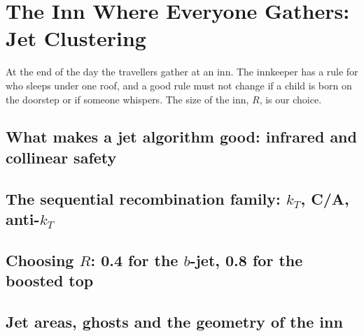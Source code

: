 \chapter{The Inn Where Everyone Gathers: Jet Clustering}
\label{ch:the_inn}

\begin{journeybox}
At the end of the day the travellers gather at an inn. The innkeeper has a rule
for who sleeps under one roof, and a good rule must not change if a child is
born on the doorstep or if someone whispers. The size of the inn, $R$, is our
choice.
\end{journeybox}


\section{What makes a jet algorithm good: infrared and collinear safety}
\label{sec:the_inn:what_makes_a_jet_algorithm_good_infrared}

\section{The sequential recombination family: $k_T$, C/A, anti-$k_T$}
\label{sec:the_inn:the_sequential_recombination_family_k_t_}

\section{Choosing $R$: 0.4 for the $b$-jet, 0.8 for the boosted top}
\label{sec:the_inn:choosing_r_0_4_for_the_b_jet_0_8_for_the}

\section{Jet areas, ghosts and the geometry of the inn}
\label{sec:the_inn:jet_areas_ghosts_and_the_geometry_of_the}

